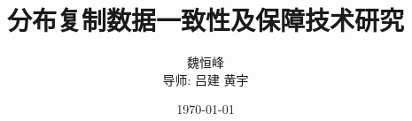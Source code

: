 \documentclass{beamer}
\title[分布复制数据一致性及保障技术研究]{分布复制数据一致性及保障技术研究}
\subtitle{}
\author[魏恒峰]{魏恒峰 \\导师: 吕建 \hspace{0.20cm} 黄宇}
\institute{南京大学软件所}
\date{\today}
\theoremstyle{plain}
\begin{document}
\renewcommand\figurename{图} 
\renewcommand\tablename{表} 

\maketitle






\end{document}
